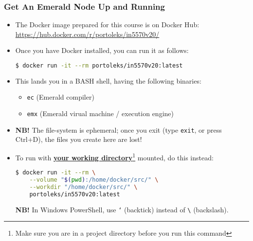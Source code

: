 \begin{frame}[fragile]

\frametitle{Get An Emerald Node Up and Running}

\begin{itemize}

\footnotesize

\item The Docker image prepared for this course is on Docker
Hub:\\[0.5em] \url{https://hub.docker.com/r/portoleks/in5570v20/}

\item Once you have Docker installed, you can run it as follows:

\begin{lstlisting}[language=bash]
$ docker run -it --rm portoleks/in5570v20:latest
\end{lstlisting}

\item This lands you in a BASH shell, having the following binaries:

\begin{itemize}

\footnotesize

\item \texttt{ec} (Emerald compiler)

\item \texttt{emx} (Emerald virual machine / execution engine)

\end{itemize}

\item \textbf{NB!} The file-system is ephemeral; once you exit (type
\texttt{exit}, or press Ctrl+D), the files you create here are lost!

\item To run with \textbf{\underline{your working
directory}}\footnote{Make sure you are in a project directory before
you run this command} mounted, do this instead:

\begin{lstlisting}[language=bash]
$ docker run -it --rm \
    --volume "$(pwd):/home/docker/src/" \
    --workdir "/home/docker/src/" \
    portoleks/in5570v20:latest
\end{lstlisting}

\textbf{NB!} In Windows PowerShell, use \texttt{\lq} (backtick)
instead of \texttt{\textbackslash} (backslash).

\end{itemize}

\end{frame}


